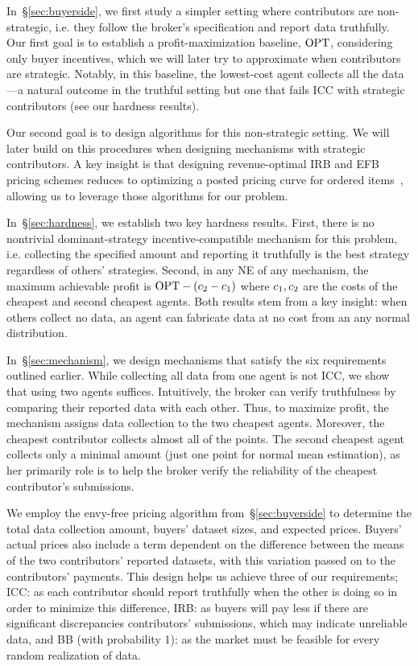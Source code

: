 In~\S\ref{sec:buyerside}, we first study a simpler setting where contributors are non-strategic, i.e. they follow the broker’s specification and report data truthfully.  
Our first goal is to establish a profit-maximization baseline, ${\rm OPT}$, considering only buyer incentives, which we will later try to approximate when contributors are strategic.  
Notably, in this baseline, the lowest-cost agent collects all the data---a natural outcome in the truthful setting but one that fails ICC with strategic contributors (see our hardness results).  

Our second goal is to design algorithms for this non-strategic setting. We will later build on this procedures when designing mechanisms with strategic contributors.  
A key insight is that designing revenue-optimal IRB and EFB pricing schemes reduces to optimizing a posted pricing curve for ordered items~\citep{chawla2022pricing}, allowing us to leverage those algorithms for our problem.  


In~\S\ref{sec:hardness}, we establish two key hardness results.
First, there is no nontrivial dominant-strategy incentive-compatible mechanism for this problem,
i.e. collecting the specified amount and reporting it truthfully is the best strategy regardless of others' strategies.
Second,  in any NE of any mechanism, the maximum achievable profit is  ${\rm OPT} - (c_2 - c_1)$ where $c_1,c_2$ are the costs of the cheapest and second cheapest agents.
Both results stem from a key insight: when others collect no data, an agent can fabricate data at no cost from an any normal distribution.

In~\S\ref{sec:mechanism}, we design mechanisms that satisfy the six requirements outlined earlier.  
While collecting all data from one agent is not ICC, we show that using two agents suffices.  
Intuitively, the broker can verify truthfulness by comparing their reported data with each other.  
Thus, to maximize profit, the mechanism assigns data collection to the two cheapest agents.  
Moreover, the cheapest contributor collects almost all of the points. The second cheapest agent collects only a minimal amount (just one point for normal mean estimation), as her primarily role is to help the broker verify the reliability of the cheapest contributor's submissions.

We employ the envy-free pricing algorithm from~\S\ref{sec:buyerside} to determine the total data collection amount, buyers' dataset sizes, and expected prices.  
Buyers' actual prices also include a term dependent on the difference
between the means of the two contributors' reported datasets, with this variation passed on to the contributors' payments.
This design helps us achieve three of our requirements;
ICC: as each contributor should report truthfully when the other is doing so in order to minimize this difference,
IRB: as buyers will pay less if there are significant discrepancies contributors' submissions, which may indicate unreliable data,
and
BB (with probability 1): as the market must be feasible for every random realization of data.


